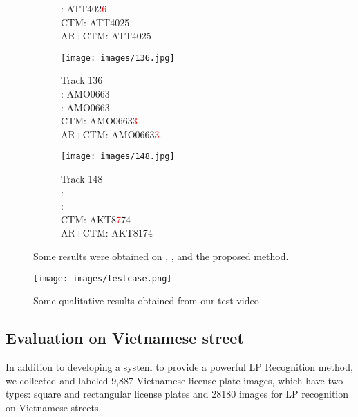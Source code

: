 \documentclass[conference]{IEEEtran}
\begin{document}
\begin{figure}[ht]
\begin{subfigure}[b]{0.33\linewidth}
{    \cite{layout}: {\fontsize{8}{8}\selectfont ATT402\textcolor{red}{6}}\\
    {\fontsize{8}{8}\selectfont CTM: ATT4025}\\
    {\fontsize{8}{8}\selectfont AR+CTM: ATT4025}}
    \label{compare:c} 
  \end{subfigure}\begin{subfigure}[b]{0.33\linewidth}
    \centering
    \captionsetup{justification=centering}
    \texttt{[image: images/136.jpg]} 
    \caption{Track 136\\
    \cite{ufpr}: {\fontsize{8}{8}\selectfont AMO0663}\\
    \cite{layout}: {\fontsize{8}{8}\selectfont AMO0663}\\
    {\fontsize{8}{8}\selectfont CTM: AMO0663\textcolor{red}{3}}\\
    {\fontsize{8}{8}\selectfont AR+CTM: AMO0663\textcolor{red}{3}}}
    \label{compare:d} 
  \end{subfigure} 
  \begin{subfigure}[b]{0.33\linewidth}
    \centering
    \captionsetup{justification=centering}
    \texttt{[image: images/148.jpg]} 
    \caption{Track 148\\
    \cite{ufpr}: -\\
    \cite{layout}: -\\
    {\fontsize{8}{8}\selectfont CTM: AKT8\textcolor{red}{7}74}\\
    {\fontsize{8}{8}\selectfont AR+CTM: AKT8174}}
    \label{compare:d} 
  \end{subfigure} 
  \caption{Some results were obtained on \cite{ufpr}, \cite{layout}, and the proposed method.}
  \label{compare} 
\end{figure}
\begin{figure*}[htp]
  \centering
    \texttt{[image: images/testcase.png]}
  \caption{Some qualitative results obtained from our test video}
  \label{testcase}
\end{figure*}
\subsection{Evaluation on Vietnamese street}
In addition to developing a system to provide a powerful LP Recognition method, we collected and labeled 9,887 Vietnamese license plate images, which have two types: square and rectangular license plates and 28180 images for LP recognition on Vietnamese streets. 
\end{document}
